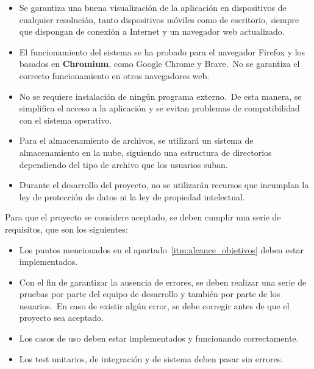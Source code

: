 \begin{itemize}
	\item Se garantiza una buena visualización de la aplicación en dispositivos de cualquier resolución, tanto
	dispositivos móviles como de escritorio, siempre que dispongan de conexión a Internet y un navegador web
	actualizado.
	\item El funcionamiento del sistema se ha probado para el navegador Firefox y los basados en \textbf{Chromium},
	como Google Chrome y Brave.\ No se garantiza el correcto funcionamiento en otros navegadores web.
	\item No se requiere instalación de ningún programa externo.\ De esta manera, se
	simplifica el acceso a la aplicación y se evitan problemas de compatibilidad con el sistema operativo.
	\item Para el almacenamiento de archivos, se utilizará un sistema de almacenamiento en la nube, siguiendo
	una estructura de directorios dependiendo del tipo de archivo que los usuarios suban.
	\item Durante el desarrollo del proyecto, no se utilizarán recursos que incumplan la ley de protección de
	datos ni la ley de propiedad intelectual.
\end{itemize}
\label{itm:alcance_limitaciones}


Para que el proyecto se considere aceptado, se deben cumplir una serie de requisitos, que son los siguientes:

\begin{itemize}
	\item Los puntos mencionados en el apartado~\ref{itm:alcance_objetivos} deben estar implementados.
	\item Con el fin de garantizar la ausencia de errores, se deben realizar una serie de pruebas por parte del equipo
	de desarrollo y también por parte de los usuarios.\ En caso de existir algún error, se debe corregir antes de
	que el proyecto sea aceptado.
	\item Los casos de uso deben estar implementados y funcionando correctamente.
	\item Los test unitarios, de integración y de sistema deben pasar sin errores.
\end{itemize}
\label{itm:alcance_criterios_aceptacion}
